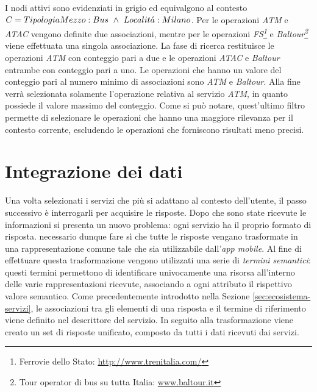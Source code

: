 I nodi attivi sono evidenziati in grigio ed equivalgono al contesto $ C = Tipologia\\Mezzo: Bus\ \land\ Localit\acute{a}: Milano $. Per le operazioni \emph{ATM} e \emph{ATAC} vengono definite due associazioni, mentre per le operazioni \emph{FS\footnote{Ferrovie dello Stato: \url{http://www.trenitalia.com/}}} e \emph{Baltour\footnote{Tour operator di bus su tutta Italia: \url{www.baltour.it}}} viene effettuata una singola associazione. La fase di ricerca restituisce le operazioni \emph{ATM} con conteggio pari a due e le operazioni \emph{ATAC} e \emph{Baltour} entrambe con conteggio pari a uno. Le operazioni che hanno un valore del conteggio pari al numero minimo di associazioni sono \emph{ATM} e \emph{Baltour}. Alla fine verrà selezionata solamente l'operazione relativa al servizio \emph{ATM}, in quanto possiede il valore massimo del conteggio. Come si può notare, quest'ultimo filtro permette di selezionare le operazioni che hanno una maggiore rilevanza per il contesto corrente, escludendo le operazioni che forniscono risultati meno precisi.

\section{Integrazione dei dati\label{sec:integrazione-dati}}

Una volta selezionati i servizi che più si adattano al contesto dell'utente, il passo successivo è interrogarli per acquisire le risposte. Dopo che sono state ricevute le informazioni si presenta un nuovo problema: ogni servizio ha il proprio formato di risposta. \upe necessario dunque fare sì che tutte le risposte vengano trasformate in una rappresentazione comune tale che sia utilizzabile dall'\emph{app mobile}. Al fine di effettuare questa trasformazione vengono utilizzati una serie di \emph{termini semantici}: questi termini permettono di identificare univocamente una risorsa all'interno delle varie rappresentazioni ricevute, associando a ogni attributo il rispettivo valore semantico. Come precedentemente introdotto nella Sezione \ref{sec:ecosistema-servizi}, le associazioni tra gli elementi di una risposta e il termine di riferimento viene definito nel descrittore del servizio. In seguito alla trasformazione viene creato un set di risposte unificato, composto da tutti i dati ricevuti dai servizi.

